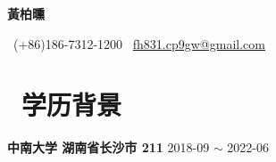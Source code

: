 \documentclass[10pt, a4paper]{article}
\begin{document}

%

\centerline{\LARGE\bfseries{黃柏曛}}


\centerline{\normalsize{\faPhone\ (+86)186-7312-1200 \quad \faEnvelope\ \href{gmail:fh831.cp9gw@gmail.com}{fh831.cp9gw@gmail.com}}}


\section{\color{CVBlue}\faGraduationCap\  学历背景}

\textbf{中南大学 \quad 湖南省长沙市  211} \hfill 2018-09 $\sim$ 2022-06

\end{document}
